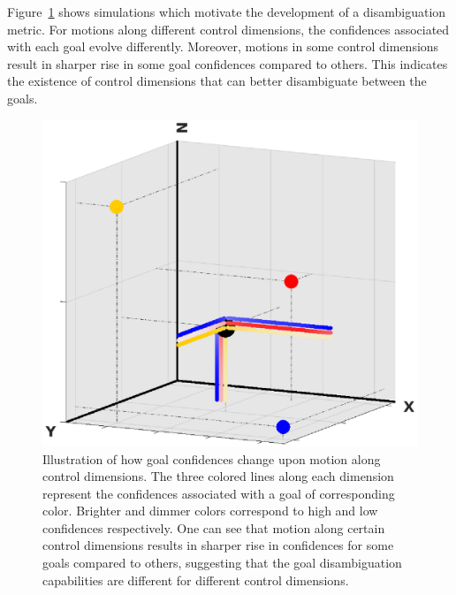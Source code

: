 \documentclass[natbib, twocolumn]{svjour3}          %
\begin{document}
Figure~\ref{fig:disamb_motivation} shows simulations which motivate the development of a disambiguation metric. For motions along different control dimensions, the confidences associated with each goal evolve differently. Moreover, motions in some control dimensions result in sharper rise in some goal confidences compared to others. This indicates the existence of control dimensions that can better disambiguate between the goals. 

\begin{figure}[h]
	\centering
	\includegraphics[width = 1\hsize]{Fig3.eps}
	\caption{Illustration of how goal confidences change upon motion along control dimensions. The three colored lines along each dimension represent the confidences associated with a goal of corresponding color. Brighter and dimmer colors correspond to high and low confidences respectively. One can see that motion along certain control dimensions results in sharper rise in confidences for some goals compared to others, suggesting that the goal disambiguation capabilities are different for different control dimensions.}
	\label{fig:disamb_motivation}
\end{figure}
\end{document}
